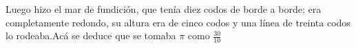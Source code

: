 \documentclass[preview]{standalone}
\begin{document}
\begin{center}
Luego hizo el mar de fundición, que tenía diez codos de borde a borde; era completamente redondo, su altura era de cinco codos y una línea de treinta codos lo rodeaba.Acá se deduce que se tomaba $\pi$ como $\frac{30}{10}$
\end{center}
\end{document}
